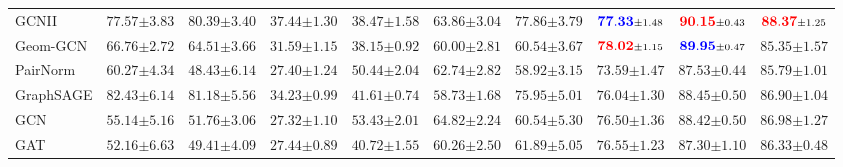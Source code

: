 \documentclass{article}
\newcommand{\first}[1]{\mathbf{\textcolor{red}{#1}}}
\newcommand{\second}[1]{\mathbf{\textcolor{blue}{#1}}}
\begin{document}
\begin{table*}[t]
{\begin{tabular}{l ccccccccc}
         GCNII &
         $77.57 {\scriptstyle \pm 3.83}$ &
         $80.39 {\scriptstyle \pm 3.40}$  &
         $37.44 {\scriptstyle \pm 1.30}$ &
         $38.47 {\scriptstyle \pm 1.58}$ &
         $63.86 {\scriptstyle \pm 3.04}$ &
         $77.86 {\scriptstyle \pm 3.79}$ &
         $\second{77.33} {\scriptstyle \pm 1.48}$ &
         $\first{90.15} {\scriptstyle \pm 0.43}$ &
         $\first{88.37} {\scriptstyle \pm 1.25}$ \\
         
         Geom-GCN &
         $66.76 {\scriptstyle \pm 2.72}$ &
         $64.51 {\scriptstyle \pm 3.66}$ &
         $31.59 {\scriptstyle \pm 1.15}$ & 
         $38.15 {\scriptstyle \pm 0.92}$ & 
         $60.00 {\scriptstyle \pm 2.81}$ &
         $60.54 {\scriptstyle \pm 3.67}$ &
         $\first{78.02} {\scriptstyle \pm 1.15}$ &
         $\second{89.95} {\scriptstyle \pm 0.47}$ &  
         $85.35 {\scriptstyle \pm 1.57}$ \\ 
         
         PairNorm &
         $60.27 {\scriptstyle \pm 4.34}$ &
         $48.43 {\scriptstyle \pm 6.14}$ &
         $27.40 {\scriptstyle \pm 1.24}$ & 
         $50.44 {\scriptstyle \pm 2.04}$ & 
         $62.74 {\scriptstyle \pm 2.82}$ &
         $58.92 {\scriptstyle \pm 3.15}$ &
         $73.59 {\scriptstyle \pm 1.47}$ &
         $87.53 {\scriptstyle \pm 0.44}$ &
         $85.79 {\scriptstyle \pm 1.01}$ \\ 
         
         GraphSAGE &
         $82.43 {\scriptstyle \pm 6.14}$ &
         $81.18 {\scriptstyle \pm 5.56}$ &
         $34.23 {\scriptstyle \pm 0.99}$ & 
         $41.61 {\scriptstyle \pm 0.74}$ & 
         $58.73 {\scriptstyle \pm 1.68}$ &
         $75.95 {\scriptstyle \pm 5.01}$ &
         $76.04 {\scriptstyle \pm 1.30}$ &
         $88.45 {\scriptstyle \pm 0.50}$ &
         $86.90 {\scriptstyle \pm 1.04}$\\
         
         GCN &
         $55.14 {\scriptstyle \pm 5.16}$ &
         $51.76 {\scriptstyle \pm 3.06}$ &
         $27.32 {\scriptstyle \pm 1.10}$ & 
         $53.43 {\scriptstyle \pm 2.01}$ &
         $64.82 {\scriptstyle \pm 2.24}$ &
         $60.54 {\scriptstyle \pm 5.30}$ &
         $76.50 {\scriptstyle \pm 1.36}$ &
         $88.42 {\scriptstyle \pm 0.50}$ &
         $86.98 {\scriptstyle \pm 1.27}$ \\ 
         
         GAT &
         $52.16 {\scriptstyle \pm 6.63}$ &
         $49.41 {\scriptstyle \pm 4.09}$ &
         $27.44 {\scriptstyle \pm 0.89}$ & 
         $40.72 {\scriptstyle \pm 1.55}$ &
         $60.26 {\scriptstyle \pm 2.50}$ &
         $61.89 {\scriptstyle \pm 5.05}$ &
         $76.55 {\scriptstyle \pm 1.23}$ &
         $87.30 {\scriptstyle \pm 1.10}$ & 
         $86.33 {\scriptstyle \pm 0.48}$ \\ 
         

\end{tabular}}
\end{table*}
\end{document}
